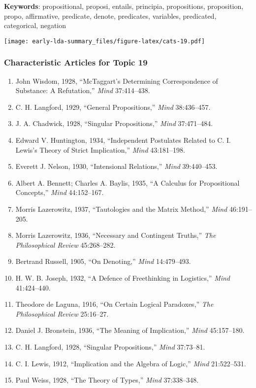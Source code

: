 \documentclass[
]{article}
\begin{document}
\textbf{Keywords}: propositional, proposi, entails, principia,
propositions, proposition, propo, affirmative, predicate, denote,
predicates, variables, predicated, categorical, negation

\texttt{[image: early-lda-summary\_files/figure-latex/cats-19.pdf]}
\newpage 

\hypertarget{characteristic-articles-for-topic-19}{%
\subsubsection{Characteristic Articles for Topic
19}\label{characteristic-articles-for-topic-19}}

\begin{enumerate}
\def\labelenumi{\arabic{enumi}.}
\item
  John Wisdom, 1928, ``McTaggart's Determining Correspondence of
  Substance: A Refutation,'' \emph{Mind} 37:414--438.
\item
  C. H. Langford, 1929, ``General Propositions,'' \emph{Mind}
  38:436--457.
\item
  J. A. Chadwick, 1928, ``Singular Propositions,'' \emph{Mind}
  37:471--484.
\item
  Edward V. Huntington, 1934, ``Independent Postulates Related to C. I.
  Lewis's Theory of Strict Implication,'' \emph{Mind} 43:181--198.
\item
  Everett J. Nelson, 1930, ``Intensional Relations,'' \emph{Mind}
  39:440--453.
\item
  Albert A. Bennett; Charles A. Baylis, 1935, ``A Calculus for
  Propositional Concepts,'' \emph{Mind} 44:152--167.
\item
  Morris Lazerowitz, 1937, ``Tautologies and the Matrix Method,''
  \emph{Mind} 46:191--205.
\item
  Morris Lazerowitz, 1936, ``Necessary and Contingent Truths,''
  \emph{The Philosophical Review} 45:268--282.
\item
  Bertrand Russell, 1905, ``On Denoting,'' \emph{Mind} 14:479--493.
\item
  H. W. B. Joseph, 1932, ``A Defence of Freethinking in Logistics,''
  \emph{Mind} 41:424--440.
\item
  Theodore de Laguna, 1916, ``On Certain Logical Paradoxes,'' \emph{The
  Philosophical Review} 25:16--27.
\item
  Daniel J. Bronstein, 1936, ``The Meaning of Implication,'' \emph{Mind}
  45:157--180.
\item
  C. H. Langford, 1928, ``Singular Propositions,'' \emph{Mind}
  37:73--81.
\item
  C. I. Lewis, 1912, ``Implication and the Algebra of Logic,''
  \emph{Mind} 21:522--531.
\item
  Paul Weiss, 1928, ``The Theory of Types,'' \emph{Mind} 37:338--348.
\end{enumerate}
\end{document}
